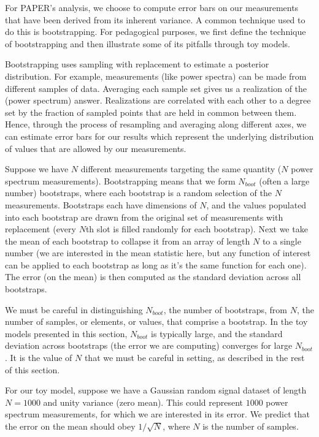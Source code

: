 \documentclass[preprint2,numberedappendix,tighten]{aastex6}  %
\begin{document}
For PAPER's analysis, we choose to compute error bars on our measurements that have been derived from its inherent variance. A common technique used to do this is bootstrapping. For pedagogical purposes, we first define the technique of bootstrapping and then illustrate some of its pitfalls through toy models.

Bootstrapping uses sampling with replacement to estimate a posterior distribution. For example, measurements (like power spectra) can be made from different samples of data. Averaging each sample set gives us a realization of the (power spectrum) answer. Realizations are correlated with each other to a degree set by the fraction of sampled points that are held in common between them. Hence, through the process of resampling and averaging along different axes, we can estimate error bars for our results which represent the underlying distribution of values that are allowed by our measurements.

Suppose we have $N$ different measurements targeting the same quantity ($N$ power spectrum measurements). Bootstrapping means that we form $N_{boot}$ (often a large number) bootstraps, where each bootstrap is a random selection of the $N$ measurements. Bootstraps each have dimensions of $N$, and the values populated into each bootstrap are drawn from the original set of measurements with replacement (every $N$th slot is filled randomly for each bootstrap). Next we take the mean of each bootstrap to collapse it from an array of length $N$ to a single number (we are interested in the mean statistic here, but any function of interest can be applied to each bootstrap as long as it's the same function for each one). The error (on the mean) is then computed as the standard deviation across all bootstraps. 

We must be careful in distinguishing $N_{boot}$, the number of bootstraps, from $N$, the number of samples, or elements, or values, that comprise a bootstrap. In the toy models presented in this section, $N_{boot}$ is typically large, and the standard deviation across bootstraps (the error we are computing) converges for large $N_{boot}$. It is the value of $N$ that we must be careful in setting, as described in the rest of this section.

For our toy model, suppose we have a Gaussian random signal dataset of length $N=1000$ and unity variance (zero mean). This could represent $1000$ power spectrum measurements, for which we are interested in its error. We predict that the error on the mean should obey $1/\sqrt{N}$, where $N$ is the number of samples.
\end{document}
